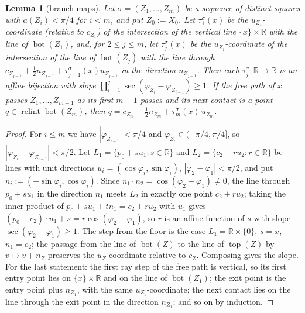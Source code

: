 \documentclass[11pt]{amsart}
\newcommand{\R}{\mathbb R}
\newcommand{\relint}{\operatorname{relint}}
\newcommand{\Bot}{\operatorname{bot}}
\newcommand{\Top}{\operatorname{top}}
\newtheorem{lemma}[theorem]{Lemma}
\theoremstyle{definition}
\theoremstyle{remark}
\numberwithin{equation}{section}
\begin{document}
\begin{lemma}[branch maps]\label{lem:flows-branch}
Let $\sigma=(Z_1,\dots,Z_m)$ be a sequence of distinct squares with $a(Z_i)<\pi/4$ for $i<m$, and put $Z_0:=X_0$. Let
$\tau^\sigma_1(x)$ be the $u_{Z_1}$-coordinate (relative to $c_{Z_1}$) of the intersection of the vertical line
$\{x\}\times\R$ with the line of $\Bot(Z_1)$, and, for $2\le j\le m$, let $\tau^\sigma_j(x)$ be the $u_{Z_j}$-coordinate of
the intersection of the line of $\Bot(Z_j)$ with the line through $c_{Z_{j-1}}+\frac12n_{Z_{j-1}}+\tau^\sigma_{j-1}(x)u_{Z_{j-1}}$
in the direction $n_{Z_{j-1}}$. Then each $\tau^\sigma_j:\R\to\R$ is an affine bijection with slope
$\prod_{i=1}^{j}\sec(\varphi_{Z_i}-\varphi_{Z_{i-1}})\ge1$. If the free path of $x$ passes $Z_1,\dots,Z_{m-1}$ as its
first $m-1$ passes and its next contact is a point $q\in\relint\Bot(Z_m)$, then
$q=c_{Z_m}-\frac12n_{Z_m}+\tau^\sigma_m(x)\,u_{Z_m}$.
\end{lemma}

\begin{proof}
For $i\le m$ we have $|\varphi_{Z_{i-1}}|<\pi/4$ and $\varphi_{Z_i}\in(-\pi/4,\pi/4]$, so
$|\varphi_{Z_i}-\varphi_{Z_{i-1}}|<\pi/2$. Let $L_1=\{p_0+su_1:s\in\R\}$ and $L_2=\{c_2+ru_2:r\in\R\}$ be lines with unit
directions $u_i=(\cos\varphi_i,\sin\varphi_i)$, $|\varphi_2-\varphi_1|<\pi/2$, and put $n_i:=(-\sin\varphi_i,\cos\varphi_i)$.
Since $n_1\cdot n_2=\cos(\varphi_2-\varphi_1)\ne0$, the line through $p_0+su_1$ in the direction $n_1$ meets $L_2$ in exactly
one point $c_2+ru_2$; taking the inner product of $p_0+su_1+tn_1=c_2+ru_2$ with $u_1$ gives
$(p_0-c_2)\cdot u_1+s=r\cos(\varphi_2-\varphi_1)$, so $r$ is an affine function of $s$ with slope
$\sec(\varphi_2-\varphi_1)\ge1$. The step from the floor is the case $L_1=\R\times\{0\}$, $s=x$, $n_1=e_2$; the passage
from the line of $\Bot(Z)$ to the line of $\Top(Z)$ by $v\mapsto v+n_Z$ preserves the $u_Z$-coordinate relative to
$c_Z$. Composing gives the slope. For the last statement: the first ray step of the free path is vertical, so its first
entry point lies on $\{x\}\times\R$ and on the line of $\Bot(Z_1)$; the exit point is the entry point plus $n_{Z_1}$,
with the same $u_{Z_1}$-coordinate; the next contact lies on the line through the exit point in the direction
$n_{Z_1}$; and so on by induction.
\end{proof}
\end{document}
